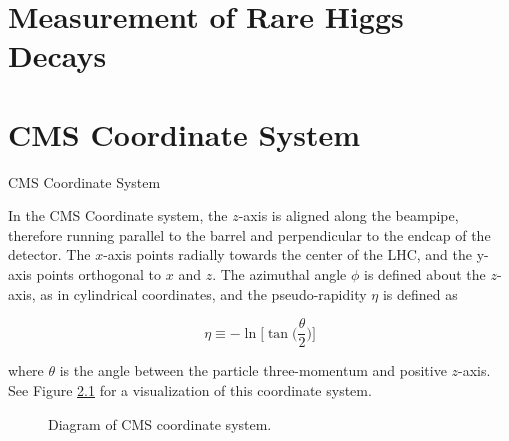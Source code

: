 \documentclass[oneside,12pt,final]{sty/ucthesis-CA2012}
\begin{document}
\begin{mainmatter}
\chapter{Measurement of Rare Higgs Decays}


\appendix

\dsp

\chapter{CMS Coordinate System}
\begin{section}{CMS Coordinate System}

In the CMS Coordinate system, the $z$-axis is aligned along the beampipe, therefore running parallel to the barrel and perpendicular to the endcap of the detector. The $x$-axis points radially towards the center of the LHC, and the y-axis points orthogonal to $x$ and $z$. The azimuthal angle $\phi$ is defined about the $z$-axis, as in cylindrical coordinates, and the pseudo-rapidity $\eta$ is defined as

\begin{equation}
    \eta \equiv -\ln{\bigg[ \tan{\bigg( \frac{\theta}{2} \bigg)} \bigg]}
\end{equation}

\noindent where $\theta$ is the angle between the particle three-momentum and positive $z$-axis. See Figure \ref{fig:cms-coords} for a visualization of this coordinate system.

\begin{figure}[htb]
\begin{center}

\end{center}
\caption{Diagram of CMS coordinate system.}
\label{fig:cms-coords}
\end{figure}

\end{section}

\end{mainmatter}

\ssp


\end{document}
